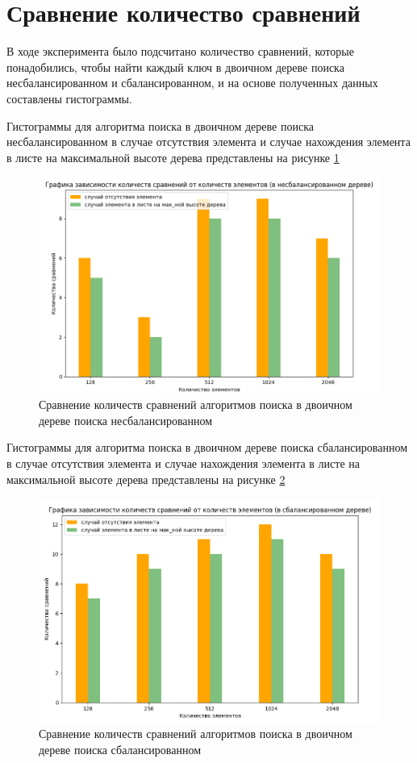 \section{Сравнение количество сравнений}

В ходе эксперимента было подсчитано количество сравнений, которые понадобились, чтобы найти каждый ключ в двоичном дереве поиска несбалансированном и сбалансированном, и на основе полученных данных составлены гистограммы.

Гистограммы для алгоритма поиска в двоичном дереве поиска несбалансированном в случае отсутствия элемента и случае нахождения элемента в листе на максимальной высоте дерева представлены на рисунке \ref{fig:bst2}

\begin{figure}[h]
	\centering
	\includegraphics[scale=0.7]{img/exp_bst1.png}
	\caption{Сравнение количеств сравнений алгоритмов поиска в двоичном дереве поиска несбалансированном}
	\label{fig:bst2}
\end{figure}

Гистограммы для алгоритма поиска в двоичном дереве поиска сбалансированном в случае отсутствия элемента и случае нахождения элемента в листе на максимальной высоте дерева представлены на рисунке \ref{fig:avl}

\begin{figure}[h]
	\centering
	\includegraphics[scale=0.7]{img/exp_avl.png}
	\caption{Сравнение количеств сравнений алгоритмов поиска в двоичном дереве поиска сбалансированном}
	\label{fig:avl}
\end{figure}

